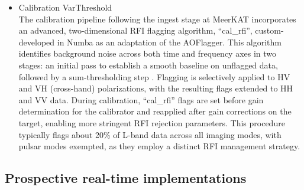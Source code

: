 \begin{itemize}
\item Calibration VarThreshold\\
The calibration pipeline following the ingest stage at MeerKAT incorporates an advanced, two-dimensional RFI flagging algorithm, ``cal\_rfi'', custom-developed in Numba as an adaptation of the AOFlagger. This algorithm identifies background noise across both time and frequency axes in two stages: an initial pass to establish a smooth baseline on unflagged data, followed by a sum-thresholding step \cite{sihlangu2019meerkat}. Flagging is selectively applied to HV and VH (cross-hand) polarizations, with the resulting flags extended to HH and VV data. During calibration, ``cal\_rfi'' flags are set before gain determination for the calibrator and reapplied after gain corrections on the target, enabling more stringent RFI rejection parameters. This procedure typically flags about 20\% of L-band data across all imaging modes, with pulsar modes exempted, as they employ a distinct RFI management strategy.


\end{itemize}

\subsection{Prospective real-time implementations}
\label{subsection:hardware:catalog:prospective}


